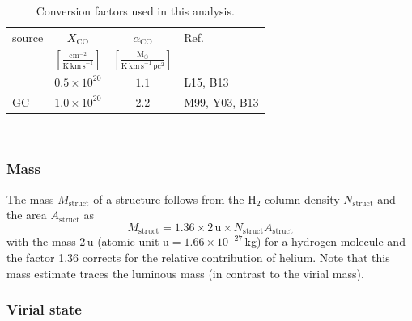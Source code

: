 \begin{table}
    \centering
    \begin{threeparttable}
        \caption[Gas mass conversion factors]{Conversion factors used in this analysis.
        \label{dendro: table: conversion factors}}
        
        \begin{tabular}{lccl}
            \toprule
            source & $X_\mathrm{CO}$ & $\alpha_\mathrm{CO}$ & Ref. \\
            & $\left[\frac{\mathrm{cm}^{-2}}{\mathrm{K\,km\,s}^{-1}}\right]$ & $\left[\frac{\mathrm{M}_\odot}{\mathrm{K\,km\,s}^{-1}\,\mathrm{pc}^2}\right]$ & \\[2mm]
            \midrule
\ngc253  & $0.5\times10^{20}$ & $1.1$ & L15, B13\\
GC      & $1.0\times10^{20}$ & $2.2$ & M99, Y03, B13\\
            \bottomrule
        \end{tabular}
        \\
    \end{threeparttable}
\end{table}


\subsubsection{Mass}
\label{dendro: section: dendrogram mass}

The mass $M_\mathrm{struct}$ of a structure follows from the H$_2$ column density $N_\mathrm{struct}$  and the area $A_\mathrm{struct}$ as
\begin{equation}
    M_\mathrm{struct} = 1.36 \times 2\,\mathrm{u} \times N_\mathrm{struct} A_\mathrm{struct}
    \label{equation: mass}
\end{equation}
with the mass 2\,u (atomic unit $\mathrm{u}=1.66\times10^{-27}$\,kg) for a hydrogen molecule and the factor 1.36 corrects for the relative contribution of helium.
Note that this mass estimate traces the luminous mass (in contrast to the virial mass).


\subsubsection{Virial state}
\label{dendro: section: dendrogram virial state}

